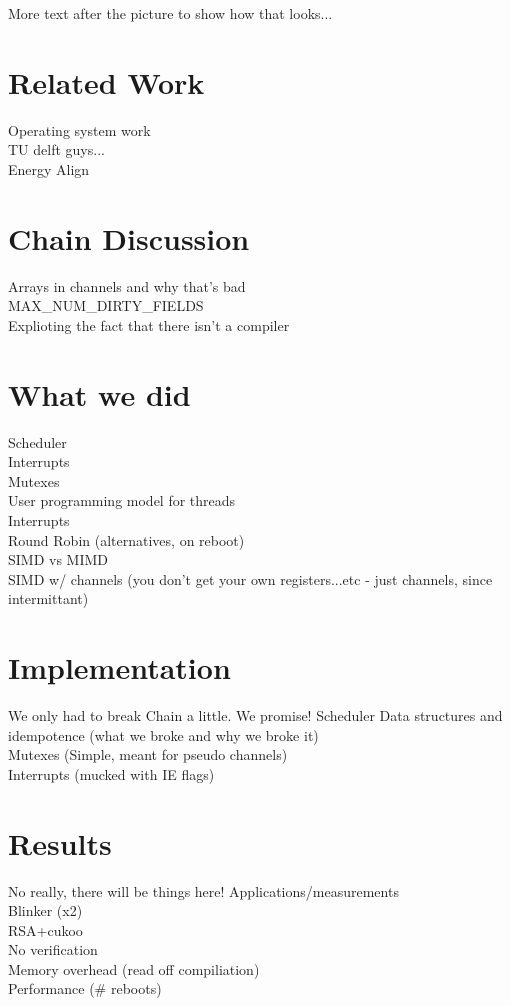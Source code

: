 \documentclass[11pt]{sensys-proc}
\newcommand{\chain}{Chain\xspace}
\begin{document}
More text after the picture to show how that looks...


\section{Related Work}
Operating system work\\
TU delft guys...\\
Energy Align\\


\section{Chain Discussion}
Arrays in channels and why that's bad\\
MAX\_NUM\_DIRTY\_FIELDS\\
Explioting the fact that there isn't a compiler\\


\section{What we did} %
Scheduler\\
Interrupts\\
Mutexes\\
User programming model for threads\\
Interrupts\\
Round Robin (alternatives, on reboot)\\
SIMD vs MIMD\\
SIMD w/ channels (you don't get your own registers...etc -
    just channels, since intermittant)\\


\section{Implementation}
We only had to break \chain a little. We promise!
Scheduler Data structures and idempotence (what we broke and why we broke it)\\
Mutexes (Simple, meant for pseudo channels)\\
Interrupts (mucked with IE flags)\\


\section{Results}
No really, there will be things here!
Applications/measurements\\
Blinker (x2)\\
RSA+cukoo\\
No verification\\
Memory overhead (read off compiliation)\\
Performance (\# reboots)\\
\end{document}
